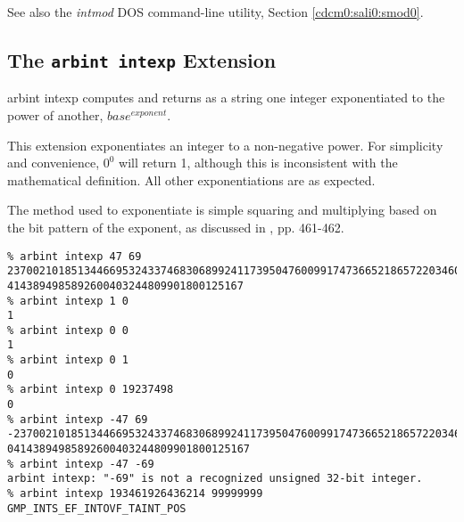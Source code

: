 \begin{tclcommandseealso}
See also the \emph{intmod} DOS command-line utility, 
Section \ref{cdcm0:sali0:smod0}.
\end{tclcommandseealso}


\subsection{The \texttt{arbint intexp} Extension}
\label{cxtn0:sarb0:sixp0}

\begin{tclcommandname}{arbint intexp}%
computes and returns as a string one integer
exponentiated to the power of another, 
$base^{exponent}$.

\end{tclcommandname}

\begin{tclcommandsynopsis}
\end{tclcommandsynopsis}

\begin{tclcommanddescription}
This extension exponentiates an integer to a non-negative
power.  For
simplicity and convenience, $0^0$ will return 1, although
this is inconsistent with the mathematical definition.
All other exponentiations are as expected.

The method used to exponentiate is simple squaring and multiplying
based on the bit pattern of the exponent, as discussed 
in \cite{bibref:b:knuthclassic2ndedvol2}, pp. 461-462.
\end{tclcommanddescription}

\begin{tclcommandsampleinvocations}
\begin{scriptsize}
\begin{verbatim}
% arbint intexp 47 69
2370021018513446695324337468306899241173950476009917473665218657220346081293500
4143894985892600403244809901800125167
% arbint intexp 1 0
1
% arbint intexp 0 0
1
% arbint intexp 0 1
0
% arbint intexp 0 19237498
0
% arbint intexp -47 69
-237002101851344669532433746830689924117395047600991747366521865722034608129350
04143894985892600403244809901800125167
% arbint intexp -47 -69
arbint intexp: "-69" is not a recognized unsigned 32-bit integer.
% arbint intexp 193461926436214 99999999
GMP_INTS_EF_INTOVF_TAINT_POS
\end{verbatim}
\end{scriptsize}
\end{tclcommandsampleinvocations}

